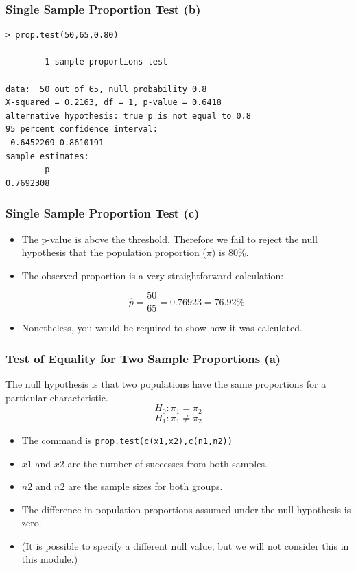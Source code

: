 \documentclass[a4]{beamer}
\begin{document}
\begin{frame}[fragile]
\frametitle{Single Sample Proportion Test (b)}

\begin{verbatim}
> prop.test(50,65,0.80)

        1-sample proportions test 

data:  50 out of 65, null probability 0.8
X-squared = 0.2163, df = 1, p-value = 0.6418
alternative hypothesis: true p is not equal to 0.8
95 percent confidence interval:
 0.6452269 0.8610191
sample estimates:
        p
0.7692308
\end{verbatim}

\end{frame}

\begin{frame}[fragile]
\frametitle{Single Sample Proportion Test (c)}

\begin{itemize}
\item The p-value is above the threshold. Therefore we fail to reject the null hypothesis that the population proportion ($\pi$) is $80\%$.

\item The observed proportion is a very straightforward calculation:

\[ \hat{p} = \frac{50}{65} = 0.76923= 76.92\%\]
\item Nonetheless, you would be required to show how it was calculated.
\end{itemize}

\end{frame}

\begin{frame}[fragile]
\frametitle{Test of Equality for Two Sample Proportions (a)}
The null hypothesis is that two populations have the same proportions for a particular characteristic.
\[H_0 : \pi_1 = \pi_2 \]
\[H_1 : \pi_1 \neq \pi_2 \]
\begin{itemize}
\item The command is \texttt{prop.test(c(x1,x2),c(n1,n2))}
\item $x1$ and $x2$ are the number of successes from both samples.
\item $n2$ and $n2$ are the sample sizes for both groups.
\item The difference in population proportions assumed under the null hypothesis is zero.
\item (It is possible to specify a different null value, but we will not consider this in this module.)
\end{itemize}
\end{frame}
\end{document}
